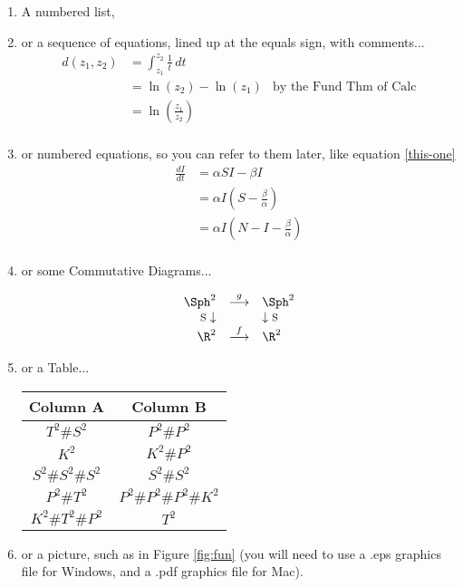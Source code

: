 \documentclass[12pt]{article}   %
\begin{document}
\begin{enumerate}
\item A numbered list,

\item or a sequence of equations, lined up at the equals sign, with comments...
\begin{align*}   %
d(z_1,z_2) & =  \int_{z_1}^{z_2} \frac{1}{t} \, dt \\
& =  \ln(z_2) - \ln(z_1) & \mbox{by the Fund Thm of Calc}\\
& =  \ln\left(\frac{z_1}{z_2}\right) \\ %
\end{align*}

\item or numbered equations, so you can refer to them later, like equation \ref{this-one}
\begin{align}
\frac{dI}{dt} &=  \alpha S I - \beta I \\
&=  \alpha I \left(S - \frac{\beta}{\alpha}\right) \label{this-one}\\
&=  \alpha I \left(N  - I  - \frac{\beta}{\alpha}\right)  \\
\end{align}

\item or some Commutative Diagrams...

$$\begin{array}{rcl}
\Sph^2  & \stackrel{g}{\longrightarrow} & \Sph^2 \\
\mbox{\footnotesize{S}} \downarrow & & \downarrow \mbox{\footnotesize{S}} \\
\R^2 & \stackrel{f}{\longrightarrow} & \R^2 \\
\end{array}$$

\item or a Table...

\begin{center}
\begin{tabular}{|c|c|}
\hline
Column A & Column B \\
\hline
$T^2 \# S^2$ & $P^2 \# P^2$ \\
$K^2$ & $K^2 \# P^2$ \\
$S^2 \# S^2 \# S^2$ & $S^2 \# S^2$ \\
$P^2 \# T^2$ & $P^2 \# P^2 \# P^2 \# K^2$ \\
$K^2 \# T^2 \# P^2$ & $T^2$ \\
\hline
\end{tabular}
\end{center}

\item or a picture, such as in Figure \ref{fig:fun} (you will need to use a .eps graphics file for Windows, and a .pdf graphics
file for Mac).

\end{enumerate}
\end{document}
